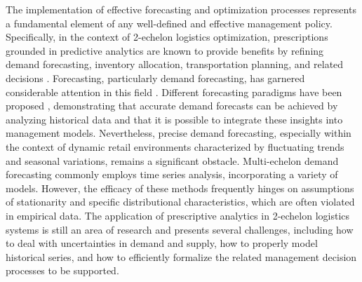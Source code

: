 \documentclass[preprint,11pt,authoryear]{elsarticle}
\begin{document}
The implementation of effective forecasting and optimization processes represents a fundamental element of any well-defined and effective management policy. Specifically, in the context of 2-echelon logistics optimization, prescriptions grounded in predictive analytics are known to provide benefits by refining demand forecasting, inventory allocation, transportation planning, and related decisions \citep{VAD12,KK10,A01}. Forecasting, particularly demand forecasting, has garnered considerable attention in this field \citep{Shenstone01}. Different forecasting paradigms have been proposed \citep{Syntetos05,Keneley02,Ma15}, demonstrating that accurate demand forecasts can be achieved by analyzing historical data and that it is possible to integrate these insights into management models. Nevertheless, precise demand forecasting, especially within the context of dynamic retail environments characterized by fluctuating trends and seasonal variations, remains a significant obstacle. Multi-echelon demand forecasting commonly employs time series analysis, incorporating a variety of models.  However, the efficacy of these methods frequently hinges on assumptions of stationarity and specific distributional characteristics, which are often violated in empirical data. 
The application of prescriptive analytics in 2-echelon logistics systems is still an area of research and presents several challenges, including how to deal with uncertainties in demand and supply, how to properly model historical series, and how to efficiently formalize the related management decision processes to be supported. 



\end{document}
